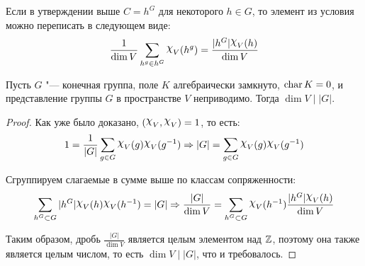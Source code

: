 \begin{note}
	Если в утверждении выше $C = h^G$ для некоторого $h \in G$, то элемент из условия можно переписать в следующем виде:
	\[\frac1{\dim{V}}\sum_{h^g \in h^G}\Chi_V(h^g) = \frac{|h^G|\Chi_V(h)}{\dim V}\]
\end{note}

\begin{theorem}
	Пусть $G$ "--- конечная группа, поле $K$ алгебраически замкнуто, $\operatorname{char}{K} = 0$, и представление группы $G$ в пространстве $V$ неприводимо. Тогда $\dim{V} \mid |G|$.
\end{theorem}

\begin{proof}
	Как уже было доказано, $(\Chi_V, \Chi_V) = 1$, то есть:
	\[1 = \frac1{|G|}\sum_{g \in G}\Chi_V(g)\Chi_V(g^{-1}) \ra |G| = \sum_{g \in G}\Chi_V(g)\Chi_V(g^{-1})\]
	
	Сгруппируем слагаемые в сумме выше по классам сопряженности:
	\[\sum_{h^G \subset G}|h^G|\Chi_V(h)\Chi_V(h^{-1}) = |G| \ra \frac{|G|}{\dim{V}} = \sum_{h^G\subset G}\Chi_V(h^{-1})\frac{|h^G|\Chi_V(h)}{\dim{V}}\]
	
	Таким образом, дробь $\frac{|G|}{\dim{V}}$ является целым элементом над $\mathbb{Z}$, поэтому она также является целым числом, то есть $\dim{V} \mid |G|$, что и требовалось.
\end{proof}